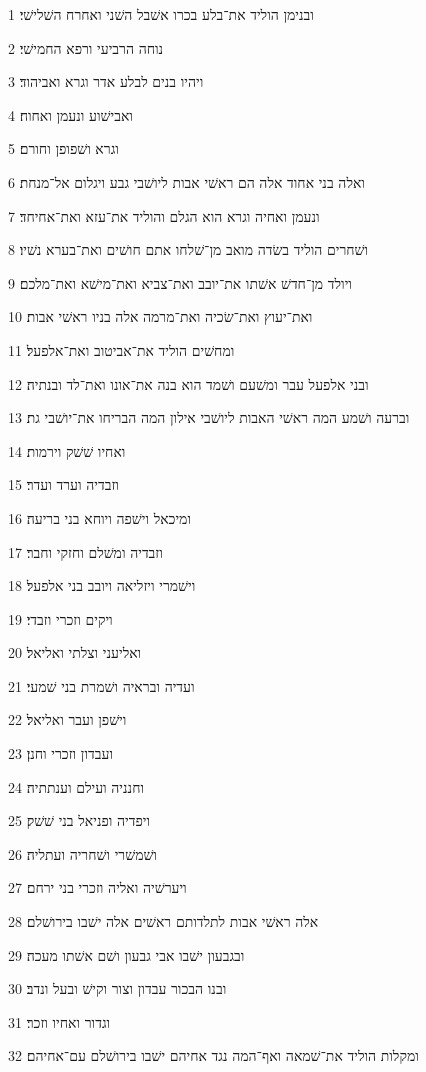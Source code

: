\par 1 ובנימן הוליד את־בלע בכרו אשׁבל השׁני ואחרח השׁלישׁי׃
\par 2 נוחה הרביעי ורפא החמישׁי׃
\par 3 ויהיו בנים לבלע אדר וגרא ואביהוד׃
\par 4 ואבישׁוע ונעמן ואחוח׃
\par 5 וגרא ושׁפופן וחורם׃
\par 6 ואלה בני אחוד אלה הם ראשׁי אבות ליושׁבי גבע ויגלום אל־מנחת׃
\par 7 ונעמן ואחיה וגרא הוא הגלם והוליד את־עזא ואת־אחיחד׃
\par 8 ושׁחרים הוליד בשׂדה מואב מן־שׁלחו אתם חושׁים ואת־בערא נשׁיו׃
\par 9 ויולד מן־חדשׁ אשׁתו את־יובב ואת־צביא ואת־מישׁא ואת־מלכם׃
\par 10 ואת־יעוץ ואת־שׂכיה ואת־מרמה אלה בניו ראשׁי אבות׃
\par 11 ומחשׁים הוליד את־אביטוב ואת־אלפעל׃
\par 12 ובני אלפעל עבר ומשׁעם ושׁמד הוא בנה את־אונו ואת־לד ובנתיה׃
\par 13 וברעה ושׁמע המה ראשׁי האבות ליושׁבי אילון המה הבריחו את־יושׁבי גת׃
\par 14 ואחיו שׁשׁק וירמות׃
\par 15 וזבדיה וערד ועדר׃
\par 16 ומיכאל וישׁפה ויוחא בני בריעה׃
\par 17 וזבדיה ומשׁלם וחזקי וחבר׃
\par 18 וישׁמרי ויזליאה ויובב בני אלפעל׃
\par 19 ויקים וזכרי וזבדי׃
\par 20 ואליעני וצלתי ואליאל׃
\par 21 ועדיה ובראיה ושׁמרת בני שׁמעי׃
\par 22 וישׁפן ועבר ואליאל׃
\par 23 ועבדון וזכרי וחנן׃
\par 24 וחנניה ועילם וענתתיה׃
\par 25 ויפדיה ופניאל בני שׁשׁק׃
\par 26 ושׁמשׁרי ושׁחריה ועתליה׃
\par 27 ויערשׁיה ואליה וזכרי בני ירחם׃
\par 28 אלה ראשׁי אבות לתלדותם ראשׁים אלה ישׁבו בירושׁלם׃
\par 29 ובגבעון ישׁבו אבי גבעון ושׁם אשׁתו מעכה׃
\par 30 ובנו הבכור עבדון וצור וקישׁ ובעל ונדב׃
\par 31 וגדור ואחיו וזכר׃
\par 32 ומקלות הוליד את־שׁמאה ואף־המה נגד אחיהם ישׁבו בירושׁלם עם־אחיהם׃
